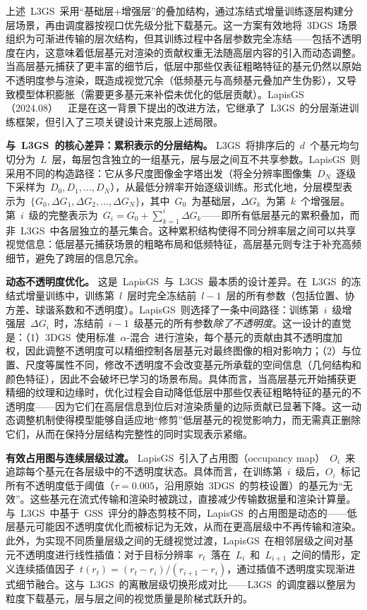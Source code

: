 上述~L3GS~采用``基础层+增强层''的叠加结构，通过冻结式增量训练逐层构建分层场景，再由调度器按视口优先级分批下载基元。这一方案有效地将~3DGS~场景组织为可渐进传输的层次结构，但其训练过程中各层参数完全冻结——包括不透明度在内，这意味着低层基元对渲染的贡献权重无法随高层内容的引入而动态调整。当高层基元捕获了更丰富的细节后，低层中那些仅表征粗略特征的基元仍然以原始不透明度参与渲染，既造成视觉冗余（低频基元与高频基元叠加产生伪影），又导致模型体积膨胀（需要更多基元来补偿未优化的低层贡献）。LapisGS（2024.08）~\cite{2408_14823}~正是在这一背景下提出的改进方法，它继承了~L3GS~的分层渐进训练框架，但引入了三项关键设计来克服上述局限。

\textbf{与~L3GS~的核心差异：累积表示的分层结构。}
L3GS~将排序后的~$d$~个基元均匀切分为~$L$~层，每层包含独立的一组基元，层与层之间互不共享参数。LapisGS~则采用不同的构造路径：它从多尺度图像金字塔出发（将全分辨率图像集~$D_N$~逐级下采样为~$D_0, D_1, \ldots, D_N$），从最低分辨率开始逐级训练。形式化地，分层模型表示为~$\{G_0, \Delta G_1, \Delta G_2, \ldots, \Delta G_N\}$，其中~$G_0$~为基础层，$\Delta G_k$~为第~$k$~个增强层。第~$i$~级的完整表示为~$G_i = G_0 + \sum_{k=1}^{i} \Delta G_k$——即所有低层基元的累积叠加，而非~L3GS~中各层独立的基元集合。这种累积结构使得不同分辨率层之间可以共享视觉信息：低层基元捕获场景的粗略布局和低频特征，高层基元则专注于补充高频细节，避免了跨层的信息冗余。

\textbf{动态不透明度优化。}
这是~LapisGS~与~L3GS~最本质的设计差异。在~L3GS~的冻结式增量训练中，训练第~$l$~层时完全冻结前~$l-1$~层的所有参数（包括位置、协方差、球谐系数和不透明度）。LapisGS~则选择了一条中间路径：训练第~$i$~级增强层~$\Delta G_i$~时，冻结前~$i-1$~级基元的所有参数\textit{除了不透明度}。这一设计的直觉是：（1）3DGS~使用标准~$\alpha$-混合~进行渲染，每个基元的贡献由其不透明度加权，因此调整不透明度可以精细控制各层基元对最终图像的相对影响力；（2）与位置、尺度等属性不同，修改不透明度不会改变基元所承载的空间信息（几何结构和颜色特征），因此不会破坏已学习的场景布局。具体而言，当高层基元开始捕获更精细的纹理和边缘时，优化过程会自动降低低层中那些仅表征粗略特征的基元的不透明度——因为它们在高层信息到位后对渲染质量的边际贡献已显著下降。这一动态调整机制使得模型能够自适应地``修剪''低层基元的视觉影响力，而无需真正删除它们，从而在保持分层结构完整性的同时实现表示紧缩。

\textbf{有效占用图与连续层级过渡。}
LapisGS~引入了占用图（occupancy map）~$O_i$~来追踪每个基元在各层级中的不透明度状态。具体而言，在训练第~$i$~级后，$O_i$~标记所有不透明度低于阈值（$\tau = 0.005$，沿用原始~3DGS~的剪枝设置）的基元为``无效''。这些基元在流式传输和渲染时被跳过，直接减少传输数据量和渲染计算量。与~L3GS~中基于~GSS~评分的静态剪枝不同，LapisGS~的占用图是动态的——低层基元可能因不透明度优化而被标记为无效，从而在更高层级中不再传输和渲染。此外，为实现不同质量层级之间的无缝视觉过渡，LapisGS~在相邻层级之间对基元不透明度进行线性插值：对于目标分辨率~$r_t$~落在~$L_i$~和~$L_{i+1}$~之间的情形，定义连续插值因子~$t(r_t) = (r_t - r_i)/(r_{i+1} - r_i)$，通过插值不透明度实现渐进式细节融合。这与~L3GS~的离散层级切换形成对比——L3GS~的调度器以整层为粒度下载基元，层与层之间的视觉质量是阶梯式跃升的。

